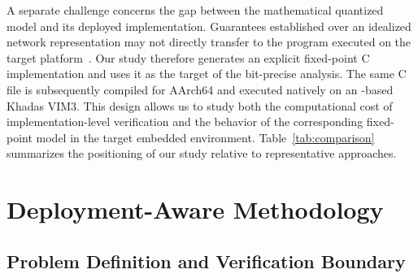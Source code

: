 A separate challenge concerns the gap between the mathematical quantized model and its deployed implementation. Guarantees established over an idealized network representation may not directly transfer to the program executed on the target platform~\cite{Cordeiro2025NNPL}. Our study therefore generates an explicit fixed-point C implementation and uses it as the target of the bit-precise analysis. The same C file is subsequently compiled for AArch64 and executed natively on an \AAOS{}-based Khadas VIM3. This design allows us to study both the computational cost of implementation-level verification and the behavior of the corresponding fixed-point model in the target embedded environment. Table~\ref{tab:comparison} summarizes the positioning of our study relative to representative approaches.

\begin{table}[h]
\centering
\caption{Positioning against representative approaches. %
}
\label{tab:comparison}
\scriptsize
{}%
\end{table}

\section{Deployment-Aware Methodology}
\label{sec:methodology}

\subsection{Problem Definition and Verification Boundary}
\label{sec:problem}


